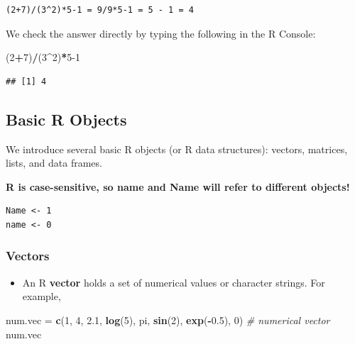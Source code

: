 \documentclass[
]{book}
\newenvironment{Shaded}{\begin{snugshade}}{\end{snugshade}}
\newcommand{\CommentTok}[1]{\textcolor[rgb]{0.56,0.35,0.01}{\textit{#1}}}
\newcommand{\DecValTok}[1]{\textcolor[rgb]{0.00,0.00,0.81}{#1}}
\newcommand{\FloatTok}[1]{\textcolor[rgb]{0.00,0.00,0.81}{#1}}
\newcommand{\FunctionTok}[1]{\textcolor[rgb]{0.13,0.29,0.53}{\textbf{#1}}}
\newcommand{\NormalTok}[1]{#1}
\newcommand{\OtherTok}[1]{\textcolor[rgb]{0.56,0.35,0.01}{#1}}
\newcommand{\SpecialCharTok}[1]{\textcolor[rgb]{0.81,0.36,0.00}{\textbf{#1}}}
\providecommand{\tightlist}{%
  \setlength{\itemsep}{0pt}\setlength{\parskip}{0pt}}
\begin{document}
\begin{verbatim}
(2+7)/(3^2)*5-1 = 9/9*5-1 = 5 - 1 = 4
\end{verbatim}

We check the answer directly by typing the following in the R Console:

\begin{Shaded}
\begin{Highlighting}[]
\NormalTok{(}\DecValTok{2}\SpecialCharTok{+}\DecValTok{7}\NormalTok{)}\SpecialCharTok{/}\NormalTok{(}\DecValTok{3}\SpecialCharTok{\^{}}\DecValTok{2}\NormalTok{)}\SpecialCharTok{*}\DecValTok{5{-}1} 
\end{Highlighting}
\end{Shaded}

\begin{verbatim}
## [1] 4
\end{verbatim}

\hypertarget{basic-r-objects}{%
\subsection{Basic R Objects}\label{basic-r-objects}}

We introduce several basic R objects (or R data structures): vectors, matrices, lists, and data frames.

\textbf{R is case-sensitive, so name and Name will refer to different objects!}

\begin{verbatim}
Name <- 1
name <- 0
\end{verbatim}

\hypertarget{vectors}{%
\subsubsection{Vectors}\label{vectors}}

\begin{itemize}
\tightlist
\item
  An R \textbf{vector} holds a set of numerical values or character strings. For example,
\end{itemize}

\begin{Shaded}
\begin{Highlighting}[]
\NormalTok{num.vec }\OtherTok{=} \FunctionTok{c}\NormalTok{(}\DecValTok{1}\NormalTok{, }\DecValTok{4}\NormalTok{, }\FloatTok{2.1}\NormalTok{, }\FunctionTok{log}\NormalTok{(}\DecValTok{5}\NormalTok{), pi, }\FunctionTok{sin}\NormalTok{(}\DecValTok{2}\NormalTok{), }\FunctionTok{exp}\NormalTok{(}\SpecialCharTok{{-}}\FloatTok{0.5}\NormalTok{), }\DecValTok{0}\NormalTok{) }\CommentTok{\# numerical vector}
\NormalTok{num.vec}
\end{Highlighting}
\end{Shaded}
\end{document}
